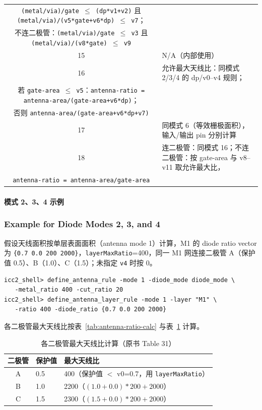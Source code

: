 \begin{table}[htbp]
\begin{tabular}{@{}cp{}@{}}
\texttt{(metal/via)/gate $\leq$ (dp*v1+v2)} 且
\texttt{(metal/via)/(v5*gate+v6*dp) $\leq$ v7}；\\
不连二极管：\texttt{(metal/via)/gate $\leq$ v3} 且
\texttt{(metal/via)/(v8*gate) $\leq$ v9} \\
15 & N/A（内部使用） \\
16 & 允许最大天线比：同模式 2/3/4 的 dp/v0--v4 规则；\\
若 \texttt{gate-area $\leq$ v5}：\texttt{antenna-ratio = antenna-area/(gate-area+v6*dp)}；\\
否则 \texttt{antenna-area/(gate-area+v6*dp+v7)} \\
17 & 同模式 6（等效栅极面积），输入/输出 pin 分别计算 \\
18 & 连二极管：同模式 16；不连二极管：按 gate-area 与 v8--v11 取允许最大比，\\
\texttt{antenna-ratio = antenna-area/gate-area} \\
\bottomrule
\end{tabular}
\end{table}

\paragraph{模式 2、3、4 示例}
\subsubsection*{Example for Diode Modes 2, 3, and 4}

假设天线面积按单层表面面积（antenna mode 1）计算，M1 的 diode ratio vector 为 \texttt{\{0.7 0.0 200 2000\}}，\texttt{layerMaxRatio}=400，同一 M1 网连接二极管 A（保护值 0.5）、B（1.0）、C（1.5）；未指定 \texttt{v4} 时按 0。

\begin{lstlisting}
icc2_shell> define_antenna_rule -mode 1 -diode_mode diode_mode \
   -metal_ratio 400 -cut_ratio 20
icc2_shell> define_antenna_layer_rule -mode 1 -layer "M1" \
   -ratio 400 -diode_ratio {0.7 0.0 200 2000}
\end{lstlisting}

各二极管最大天线比按表~\ref{tab:antenna-ratio-calc} 与表~\ref{tab:max-ratio-per-diode} 计算。

\begin{table}[htbp]
\centering
\caption{各二极管最大天线比计算（原书 Table 31）}
\label{tab:max-ratio-per-diode}
\begin{tabular}{@{}clp{}@{}}
\toprule
二极管 & 保护值 & 最大天线比 \\
\midrule
A & 0.5 & 400（保护值 $<$ v0=0.7，用 \texttt{layerMaxRatio}） \\
B & 1.0 & 2200（$(1.0+0.0)*200+2000$） \\
C & 1.5 & 2300（$(1.5+0.0)*200+2000$） \\
\bottomrule
\end{tabular}
\end{table}

